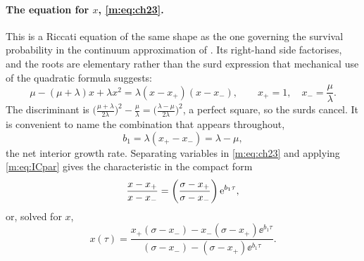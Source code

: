 \paragraph{The equation for $x$, \eqref{m:eq:ch23}.}
This is a Riccati equation of the same shape as the one governing the survival
probability in the continuum approximation of \ChA. Its right-hand side factorises, and the roots
are elementary rather than the surd expression that mechanical use of the quadratic
formula suggests:
\begin{equation}
\label{m:eq:xpm}
\mu-(\mu+\lambda)x+\lambda x^2 = \lambda(x-x_+)(x-x_-),
\qquad
x_+ = 1,\quad x_- = \frac{\mu}{\lambda} .
\end{equation}
The discriminant is
$\bigl(\tfrac{\mu+\lambda}{2\lambda}\bigr)^2 - \tfrac{\mu}{\lambda}
= \bigl(\tfrac{\lambda-\mu}{2\lambda}\bigr)^2$, a perfect square, so the surds
cancel. It is convenient to name the combination that appears throughout,
\begin{equation}
\label{m:eq:b1}
b_1 = \lambda(x_+-x_-) = \lambda-\mu ,
\end{equation}
the net interior growth rate. Separating variables in \cref{m:eq:ch23} and applying
\cref{m:eq:ICpar} gives the characteristic in the compact form
\begin{equation}
\label{m:eq:xratio}
\frac{x-x_+}{x-x_-} = \left(\frac{\sigma-x_+}{\sigma-x_-}\right)\mathrm{e}^{b_1\tau},
\end{equation}
or, solved for $x$,
\begin{equation}
\label{m:eq:xabd}
x(\tau) = \frac{x_+(\sigma-x_-) - x_-(\sigma-x_+)\ee^{b_1\tau}}
{(\sigma-x_-) - (\sigma-x_+)\ee^{b_1\tau}} .
\end{equation}

